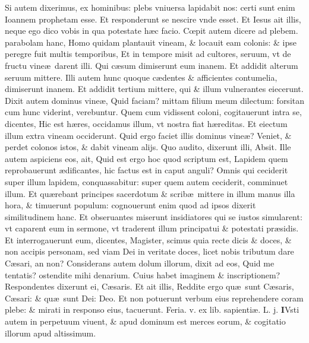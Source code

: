 \documentclass[a5paper,10pt]{book}
\def\rightmarginnote{%
	\lrmarginnote{\hskip\columnwidth \hskip -1em}}
\def\ae{æ}
\def\oe{œ}
\begin{document}
\begin{multicols*}{2}
Si autem dixerimus, ex hominibus: plebs vniuersa lapidabit nos: certi sunt enim Ioannem prophetam esse. Et responderunt se nescire vnde esset.
Et Iesus ait illis, neque ego dico vobis in qua potestate h\ae c facio. C\oe pit autem dicere ad plebem. parabolam hanc, Homo quidam plantauit vineam, \& locauit eam colonis: \& ipse peregre fuit multis temporibus, Et in tempore
misit ad cultores, seruum, vt de fructu vine\ae \ darent illi. Qui c\ae sum dimiserunt eum inanem.
Et addidit alterum seruum mittere.
\newline \indent Illi autem hunc quoque c\ae dentes \& afficientes contumelia, dimiserunt inanem. Et addidit tertium mittere, qui \& illum vulnerantes eiecerunt.
Dixit autem dominus vine\ae , Quid faciam? mittam filium meum dilectum: forsitan cum hunc viderint, verebuntur.
Quem cum vidissent coloni, cogitauerunt intra se, dicentes, Hic est h\ae res, occidamus illum, vt nostra fiat h\ae reditas.
Et eiectum illum extra vineam occiderunt. Quid ergo faciet illis dominus vine\ae ?
Veniet, \& perdet colonos istos, \& dabit vineam alijs. Quo audito, dixerunt illi, Absit. Ille autem aspiciens eos, ait, Quid est ergo hoc quod scriptum est, Lapidem quem reprobauerunt \ae dificantes, hic factus est in caput anguli?
Omnis qui ceciderit super illum lapidem, conquassabitur: super quem autem ceciderit, comminuet illum.
Et qu\ae rebant principes sacerdotum \& scrib\ae \ mittere in illum manus illa hora, \& timuerunt populum: cognouerunt enim quod ad ipsos dixerit similitudinem hanc.
Et obseruantes miserunt insidiatores qui se iustos simularent: vt caparent eum in sermone, vt traderent illum principatui \& potestati pr\ae sidis.
Et interrogauerunt eum, dicentes, Magister, scimus quia recte dicis \& doces, \& non accipis personam, sed viam Dei in veritate doces, licet nobis tributum dare C\ae sari, an non?
Considerans autem dolum illorum, dixit ad eos, Quid me tentatis? ostendite mihi denarium. Cuius habet imaginem \& inscriptionem? Respondentes dixerunt ei, C\ae saris.
Et ait illis, Reddite ergo qu\ae \ sunt C\ae saris, C\ae sari: \& qu\ae \ sunt Dei: Deo.
Et non potuerunt verbum eius reprehendere coram plebe: \& mirati in responso eius, tacuerunt.
\newline {} \color{red} \hypertarget{THU-TERTIA-POST-ADV}{Feria. v.} ex lib. sapienti\ae . L. j. \color{black}
\vspace{-1.25em}
\lettrine[lines=2]{\bfseries I}{}Vsti\rightmarginnote{ca. 5.} autem in perpetuum viuent, \& apud dominum est merces eorum, \& cogitatio illorum apud altissimum.

\end{multicols*}
\end{document}
